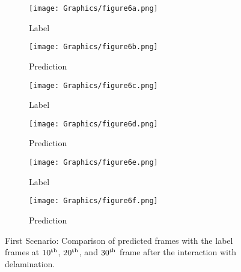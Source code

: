 \begin{figure} []
	\centering
	\begin{subfigure}[b]{0.44\textwidth}
		\centering
		\texttt{[image: Graphics/figure6a.png]}
		\caption{Label}
		\label{fig:num_415_label1}
	\end{subfigure}
	\hfill
	\begin{subfigure}[b]{0.44\textwidth}
		\centering
		\texttt{[image: Graphics/figure6b.png]} 
		\caption{Prediction}
		\label{fig:num_415_pred1}
	\end{subfigure}
	\hfill
	\begin{subfigure}[b]{0.44\textwidth}
		\centering
		\texttt{[image: Graphics/figure6c.png]}
		\caption{Label}
		\label{fig:num_415_label2}
	\end{subfigure}
	\hfill
	\begin{subfigure}[b]{0.44\textwidth}
		\centering
		\texttt{[image: Graphics/figure6d.png]}
		\caption{Prediction}
		\label{fig:num_415_pred2}
	\end{subfigure}
	\hfill
	\begin{subfigure}[b]{0.44\textwidth}
		\centering
		\texttt{[image: Graphics/figure6e.png]}
		\caption{Label}
		\label{fig:num_415_label3}
	\end{subfigure}
	\hfill	
	\begin{subfigure}[b]{0.44\textwidth}
		\centering
		\texttt{[image: Graphics/figure6f.png]}
		\caption{Prediction}
		\label{fig:num_415_pred3}
	\end{subfigure}
	\hfill	
	\caption{First Scenario: Comparison of predicted frames with the label 
		frames at $10\textsuperscript{th}$, $20\textsuperscript{th}$, and 
		$30\textsuperscript{th}$ frame after the interaction with delamination.}
	\label{fig:num_415}
\end{figure}
